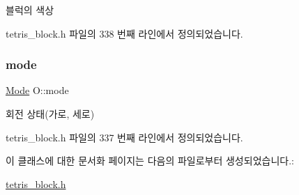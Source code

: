 블럭의 색상 



tetris\+\_\+block.\+h 파일의 338 번째 라인에서 정의되었습니다.

\mbox{\label{class_o_a8eab599843636b7f2f16ba71defceb45}} 
\subsubsection{\texorpdfstring{mode}{mode}}
{\footnotesize\ttfamily \mbox{\hyperlink{class_block_a33a96023993478ad4b52426188454765}{Mode}} O\+::mode\hspace{0.3cm}{\ttfamily [private]}}



회전 상태(가로, 세로) 



tetris\+\_\+block.\+h 파일의 337 번째 라인에서 정의되었습니다.



이 클래스에 대한 문서화 페이지는 다음의 파일로부터 생성되었습니다.\+:\begin{DoxyCompactItemize}
\item 
\mbox{\hyperlink{tetris__block_8h}{tetris\+\_\+block.\+h}}\end{DoxyCompactItemize}
